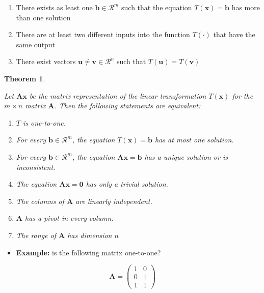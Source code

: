\documentclass[
]{book}
\providecommand{\tightlist}{%
  \setlength{\itemsep}{0pt}\setlength{\parskip}{0pt}}
\newtheorem{theorem}{Theorem}[chapter]
\theoremstyle{definition}
\theoremstyle{definition}
\theoremstyle{definition}
\theoremstyle{remark}
\begin{document}
\begin{enumerate}
\def\labelenumi{\alph{enumi})}
\item
  There exists as least one \(\mathbf{b} \in \mathcal{R}^m\) such that the equation \(T(\mathbf{x}) = \mathbf{b}\) has more than one solution
\item
  There are at least two different inputs into the function \(T(\cdot)\) that have the same output
\item
  There exist vectors \(\mathbf{u} \neq \mathbf{v} \in \mathcal{R}^n\) such that \(T(\mathbf{u}) = T(\mathbf{v})\)
\end{enumerate}

\begin{theorem}
\protect\hypertarget{thm:unlabeled-div-71}{}\label{thm:unlabeled-div-71}

Let \(\mathbf{A}\mathbf{x}\) be the matrix representation of the linear transformation \(T(\mathbf{x})\) for the \(m \times n\) matrix \(\mathbf{A}\). Then the following statements are equivalent:

\begin{enumerate}
\def\labelenumi{\arabic{enumi})}
\item
  \(T\) is one-to-one.
\item
  For every \(\mathbf{b} \in \mathcal{R}^m\), the equation \(T(\mathbf{x}) = \mathbf{b}\) has at most one solution.
\item
  For every \(\mathbf{b} \in \mathcal{R}^m\), the equation \(\mathbf{A}\mathbf{x} = \mathbf{b}\) has a unique solution or is inconsistent.
\item
  The equation \(\mathbf{A}\mathbf{x} = \mathbf{0}\) has only a trivial solution.
\item
  The columns of \(\mathbf{A}\) are linearly independent.
\item
  \(\mathbf{A}\) has a pivot in every column.
\item
  The range of \(\mathbf{A}\) has dimension \(n\)
\end{enumerate}

\end{theorem}

\begin{itemize}
\tightlist
\item
  \textbf{Example:} is the following matrix one-to-one?
\end{itemize}

\[
\mathbf{A} = \begin{pmatrix}
1 & 0 \\
0 & 1 \\
1 & 1
\end{pmatrix}
\]
\end{document}
